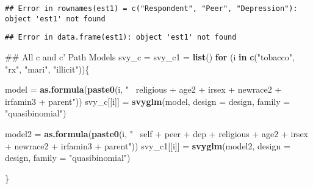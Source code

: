 \documentclass[]{article}
\newenvironment{Shaded}{\begin{snugshade}}{\end{snugshade}}
\newcommand{\KeywordTok}[1]{\textcolor[rgb]{0.13,0.29,0.53}{\textbf{#1}}}
\newcommand{\DataTypeTok}[1]{\textcolor[rgb]{0.13,0.29,0.53}{#1}}
\newcommand{\StringTok}[1]{\textcolor[rgb]{0.31,0.60,0.02}{#1}}
\newcommand{\ControlFlowTok}[1]{\textcolor[rgb]{0.13,0.29,0.53}{\textbf{#1}}}
\newcommand{\OperatorTok}[1]{\textcolor[rgb]{0.81,0.36,0.00}{\textbf{#1}}}
\newcommand{\NormalTok}[1]{#1}
\begin{document}
\begin{verbatim}
## Error in rownames(est1) = c("Respondent", "Peer", "Depression"): object 'est1' not found
\end{verbatim}

\begin{Shaded}
\end{Shaded}

\begin{verbatim}
## Error in data.frame(est1): object 'est1' not found
\end{verbatim}

\begin{Shaded}
\begin{Highlighting}[]
\NormalTok{## All c and c' Path Models}
\NormalTok{svy_c =}\StringTok{ }\NormalTok{svy_c1 =}\StringTok{ }\KeywordTok{list}\NormalTok{()}
\ControlFlowTok{for}\NormalTok{ (i }\ControlFlowTok{in} \KeywordTok{c}\NormalTok{(}\StringTok{"tobacco"}\NormalTok{, }\StringTok{"rx"}\NormalTok{, }\StringTok{"mari"}\NormalTok{, }\StringTok{"illicit"}\NormalTok{))\{}
  
\NormalTok{  model =}\StringTok{ }\KeywordTok{as.formula}\NormalTok{(}\KeywordTok{paste0}\NormalTok{(i, }\StringTok{"~ religious + age2 + }
\StringTok{                            irsex + newrace2 + irfamin3 + parent"}\NormalTok{))}
\NormalTok{  svy_c[[i]] =}\StringTok{ }\KeywordTok{svyglm}\NormalTok{(model, }\DataTypeTok{design =}\NormalTok{ design, }\DataTypeTok{family =} \StringTok{"quasibinomial"}\NormalTok{)}
  
\NormalTok{  model2 =}\StringTok{ }\KeywordTok{as.formula}\NormalTok{(}\KeywordTok{paste0}\NormalTok{(i, }\StringTok{"~ self + peer + dep + religious + age2 + }
\StringTok{                             irsex + newrace2 + irfamin3 + parent"}\NormalTok{))}
\NormalTok{  svy_c1[[i]] =}\StringTok{ }\KeywordTok{svyglm}\NormalTok{(model2, }\DataTypeTok{design =}\NormalTok{ design, }\DataTypeTok{family =} \StringTok{"quasibinomial"}\NormalTok{)}
  
\NormalTok{\}}
\end{Highlighting}
\end{Shaded}
\end{document}
